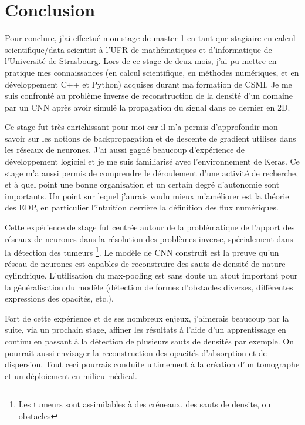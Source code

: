 
\chapter{Conclusion} %

\label{Chapter6} %


Pour conclure, j’ai effectué mon stage de master 1 en tant que stagiaire en calcul scientifique/data scientist à l'UFR de mathématiques et d'informatique de l'Université de Strasbourg. Lors de ce stage de deux mois, j’ai pu mettre en pratique mes connaissances (en calcul scientifique, en méthodes numériques, et en développement C++ et Python) acquises durant ma formation de CSMI. Je me suis confronté au problème inverse de reconstruction de la densité d'un domaine par un CNN après avoir simulé la propagation du signal dans ce dernier en 2D.

Ce stage fut très enrichissant pour moi car il m'a permis d'approfondir mon savoir sur les notions de backpropagation et de descente de gradient utilises dans les réseaux de neurones. J'ai aussi gagné beaucoup d'expérience de développement logiciel et je me suis familiarisé avec l'environnement de Keras. Ce stage m’a aussi permis de comprendre le déroulement d'une activité de recherche, et à quel point une bonne organisation et un certain degré d'autonomie sont importants. Un point sur lequel j'aurais voulu mieux m'améliorer est la théorie des EDP, en particulier l'intuition derrière la définition des flux numériques. 

Cette expérience de stage fut centrée autour de la problématique de l'apport des réseaux de neurones dans la résolution des problèmes inverse, spécialement dans la détection des tumeurs \footnote{Les tumeurs sont assimilables à des créneaux, des sauts de densite, ou obstacles}. Le modèle de CNN construit est la preuve qu'un réseau de neurones est capables de reconstruire des sauts de densité de nature cylindrique. L'utilisation du max-pooling est sans doute un atout important pour la généralisation du modèle (détection de formes d'obstacles diverses, différentes expressions des opacités, etc.).

Fort de cette expérience et de ses nombreux enjeux, j'aimerais beaucoup par la suite, via un prochain stage, affiner les résultats à l'aide d'un apprentissage en continu en passant à la détection de plusieurs sauts de densités par exemple. On pourrait aussi envisager la reconstruction des opacités d'absorption et de dispersion. Tout ceci pourrais conduite ultimement à la création d'un tomographe et un déploiement en milieu médical.
